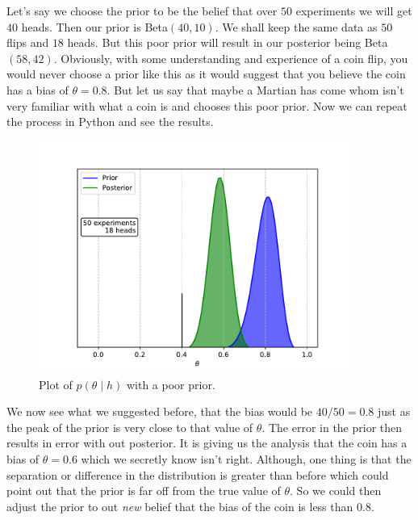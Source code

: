 \documentclass[11pt]{article}   %
\begin{document}
Let's say we choose the prior to be the belief that over $50$ experiments we will get $40$ heads. Then our prior is Beta$(40,10)$. We shall keep the same data as $50$ flips and $18$ heads. But this poor prior will result in our posterior being Beta$(58,42)$. Obviously, with some understanding and experience of a coin flip, you would never choose a prior like this as it would suggest that you believe the coin has a bias of $\theta = 0.8$. But let us say that maybe a Martian has come whom isn't very familiar with what a coin is and chooses this poor prior. Now we can repeat the process in Python and see the results.
\begin{figure}[H]
\centering
\includegraphics[width = 4in]{BadPrior1.pdf}
\caption{Plot of $p(\theta\mid h)$ with a poor prior.}
\label{figCoinFlipBad1}
\end{figure}
We now see what we suggested before, that the bias would be $40/50 = 0.8$ just as the peak of the prior is very close to that value of $\theta$. The error in the prior then results in error with out posterior. It is giving us the analysis that the coin has a bias of $\theta = 0.6$ which we secretly know isn't right. Although, one thing is that the separation or difference in the distribution is greater than before which could point out that the prior is far off from the true value of $\theta$. So we could then adjust the prior to out \textit{new} belief that the bias of the coin is less than $0.8$.
\end{document}
